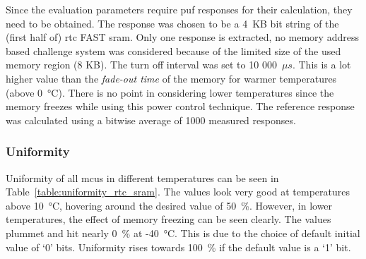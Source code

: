 Since the evaluation parameters require \gls{puf} responses for their calculation, they need to be obtained. The response was chosen to be a 4~KB bit string of the (first half of) \gls{rtc} FAST \gls{sram}. Only one response is extracted, no memory address based challenge system was considered because of the limited size of the used memory region (8 KB). The turn off interval was set to 10 000~$\mu{}s$. This is a lot higher value than the \emph{fade-out time} of the memory for warmer temperatures (above 0~°C). There is no point in considering lower temperatures since the memory freezes while using this power control technique. The reference response was calculated using a bitwise average of 1000 measured responses.

\subsubsection*{Uniformity}

Uniformity of all \glspl{mcu} in different temperatures can be seen in Table~\ref{table:uniformity_rtc_sram}. The values look very good at temperatures above 10~°C, hovering around the desired value of 50~\%. However, in lower temperatures, the effect of memory freezing can be seen clearly. The values plummet and hit nearly 0~\% at -40~°C. This is due to the choice of default initial value of `0' bits. Uniformity rises towards 100~\% if the default value is a `1' bit.

